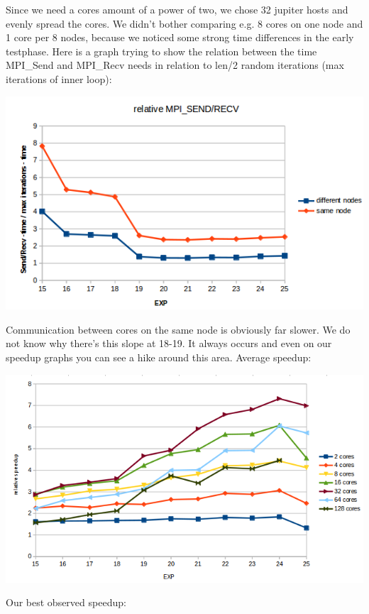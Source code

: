 Since we need a cores amount of a power of two, we chose 32 jupiter hosts and evenly spread the cores. We didn't bother comparing e.g. 8 cores on one node and 1 core per 8 nodes, because we noticed some strong time differences in the early testphase. \newline
Here is a graph trying to show the relation between the time MPI\_Send and MPI\_Recv needs in relation to len/2 random iterations (max iterations of inner loop):
\begin{center}
\includegraphics[width=\textwidth]{MPI_sr}
\end{center}
Communication between cores on the same node is obviously far slower. We do not know why there's this slope at 18-19. It always occurs and even on our speedup graphs you can see a hike around this area. 
\newline
Average speedup:
\begin{center}
\includegraphics[width=\textwidth]{MPI_med}
\end{center}
Our best observed speedup:
